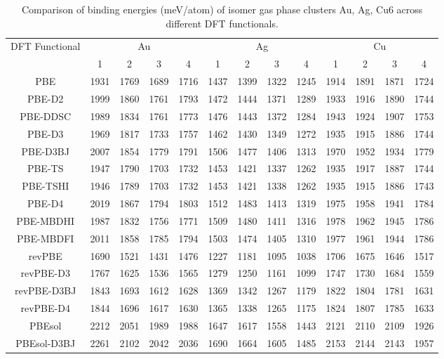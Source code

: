 \begin{table}[ht]
\centering
\caption{Comparison of binding energies (meV/atom) of isomer gas phase clusters Au, Ag, Cu6 across different DFT functionals.}
\begin{tabular}{ccccccccccccc}
\hline\hline
DFT Functional & \multicolumn{4}{c}{Au} & \multicolumn{4}{c}{Ag} & \multicolumn{4}{c}{Cu} \\ 
\cline{2-13}
 & 1 & 2 & 3 & 4 & 1 & 2 & 3 & 4 & 1 & 2 & 3 & 4 \\ \hline
PBE & 1931 & 1769 & 1689 & 1716 & 1437 & 1399 & 1322 & 1245 & 1914 & 1891 & 1871 & 1724 \\ 
PBE-D2 & 1999 & 1860 & 1761 & 1793 & 1472 & 1444 & 1371 & 1289 & 1933 & 1916 & 1890 & 1744 \\ 
PBE-DDSC & 1989 & 1834 & 1761 & 1773 & 1476 & 1443 & 1372 & 1284 & 1943 & 1924 & 1907 & 1753 \\ 
PBE-D3 & 1969 & 1817 & 1733 & 1757 & 1462 & 1430 & 1349 & 1272 & 1935 & 1915 & 1886 & 1744 \\ 
PBE-D3BJ & 2007 & 1854 & 1779 & 1791 & 1506 & 1477 & 1406 & 1313 & 1970 & 1952 & 1934 & 1779 \\ 
PBE-TS & 1947 & 1790 & 1703 & 1732 & 1453 & 1421 & 1337 & 1262 & 1935 & 1917 & 1887 & 1744 \\ 
PBE-TSHI & 1946 & 1789 & 1703 & 1732 & 1453 & 1421 & 1338 & 1262 & 1935 & 1915 & 1886 & 1743 \\ 
PBE-D4 & 2019 & 1867 & 1794 & 1803 & 1512 & 1483 & 1413 & 1319 & 1975 & 1958 & 1941 & 1784 \\ 
PBE-MBDHI & 1987 & 1832 & 1756 & 1771 & 1509 & 1480 & 1411 & 1316 & 1978 & 1962 & 1945 & 1786 \\ 
PBE-MBDFI & 2011 & 1858 & 1785 & 1794 & 1503 & 1474 & 1405 & 1310 & 1977 & 1961 & 1944 & 1786 \\ 
revPBE & 1690 & 1521 & 1431 & 1476 & 1227 & 1181 & 1095 & 1038 & 1706 & 1675 & 1646 & 1517 \\ 
revPBE-D3 & 1767 & 1625 & 1536 & 1565 & 1279 & 1250 & 1161 & 1099 & 1747 & 1730 & 1684 & 1559 \\ 
revPBE-D3BJ & 1843 & 1693 & 1612 & 1628 & 1369 & 1342 & 1267 & 1179 & 1822 & 1804 & 1781 & 1631 \\ 
revPBE-D4 & 1844 & 1696 & 1617 & 1630 & 1365 & 1338 & 1265 & 1175 & 1824 & 1807 & 1785 & 1633 \\ 
PBEsol & 2212 & 2051 & 1989 & 1988 & 1647 & 1617 & 1558 & 1443 & 2121 & 2110 & 2109 & 1926 \\ 
PBEsol-D3BJ & 2261 & 2102 & 2042 & 2036 & 1690 & 1664 & 1605 & 1485 & 2153 & 2144 & 2143 & 1957 \\ 

\end{tabular}
\end{table}
